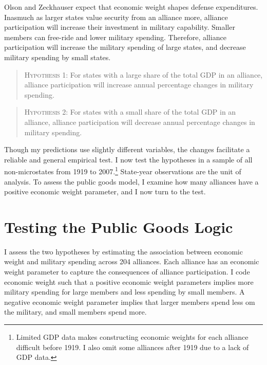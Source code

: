 \documentclass[12pt]{article}
\begin{document}
Olson and Zeckhauser expect that economic weight shapes defense expenditures. 
Inasmuch as larger states value security from an alliance more, alliance participation will increase their investment in military capability.
Smaller members can free-ride and lower military spending. 
Therefore, alliance participation will increase the military spending of large states, and decrease military spending by small states. 


\begin{quote}
\textsc{Hypothesis 1}: For states with a large share of the total GDP in an alliance, alliance participation will increase annual percentage changes in military spending. 
\end{quote}


\begin{quote}
\textsc{Hypothesis 2}: For states with a small share of the total GDP in an alliance, alliance participation will decrease annual percentage changes in military spending.
\end{quote}



Though my predictions use slightly different variables, the changes facilitate a reliable and general empirical test.
I now test the hypotheses in a sample of all non-microstates from 1919 to 2007.\footnote{Limited GDP data makes constructing economic weights for each alliance difficult before 1919. I also omit some alliances after 1919 due to a lack of GDP data.}
State-year observations are the unit of analysis.
To assess the public goods model, I examine how many alliances have a positive economic weight parameter, and I now turn to the test.   
 


\section{Testing the Public Goods Logic}


I assess the two hypotheses by estimating the association between economic weight and military spending across 204 alliances. 
Each alliance has an economic weight parameter to capture the consequences of alliance participation. 
I code economic weight such that a positive economic weight parameters implies more military spending for large members and less spending by small members. 
A negative economic weight parameter implies that larger members spend less om the military, and small members spend more. 
\end{document}
